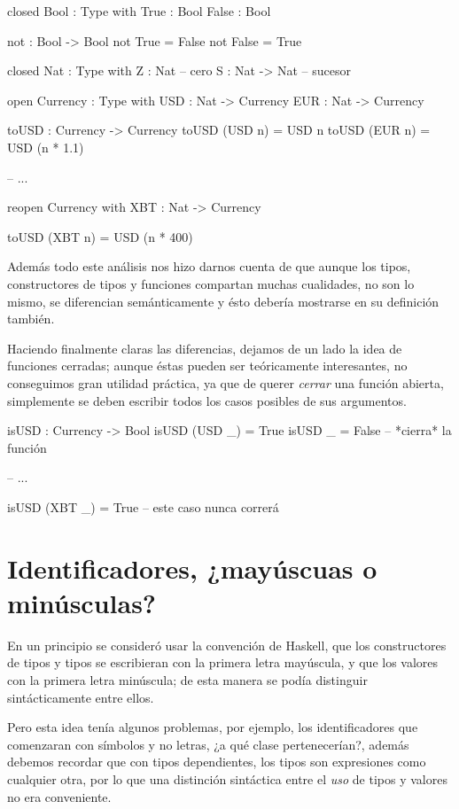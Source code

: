 \begin{blueleft}
\begin{anglercode}
closed Bool : Type with
    True : Bool
    False : Bool

not : Bool -> Bool
not True = False
not False = True

closed Nat : Type with
    Z : Nat             -- cero
    S : Nat -> Nat      -- sucesor

open Currency : Type with
    USD : Nat -> Currency
    EUR : Nat -> Currency

toUSD : Currency -> Currency
toUSD (USD n) = USD n
toUSD (EUR n) = USD (n * 1.1)

-- ...

reopen Currency with
    XBT : Nat -> Currency

toUSD (XBT n) = USD (n * 400)
\end{anglercode}

Además todo este análisis nos hizo darnos cuenta de que aunque los tipos, constructores de tipos y funciones compartan muchas cualidades, no son lo mismo, se diferencian semánticamente y ésto debería mostrarse en su definición también.

Haciendo finalmente claras las diferencias, dejamos de un lado la idea de funciones cerradas; aunque éstas pueden ser teóricamente interesantes, no conseguimos gran utilidad práctica, ya que de querer \textit{cerrar} una función abierta, simplemente se deben escribir todos los casos posibles de sus argumentos.

\begin{anglercode}
isUSD : Currency -> Bool
isUSD (USD _) = True
isUSD _ = False         -- *cierra* la función

-- ...

isUSD (XBT _) = True    -- este caso nunca correrá
\end{anglercode}
\end{blueleft}

\section{Identificadores, ¿mayúscuas o minúsculas?}

\begin{blueleft}
En un principio se consideró usar la convención de Haskell, que los constructores de tipos y tipos se escribieran con la primera letra mayúscula, y que los valores con la primera letra minúscula; de esta manera se podía distinguir sintácticamente entre ellos.

Pero esta idea tenía algunos problemas, por ejemplo, los identificadores que comenzaran con símbolos y no letras, ¿a qué clase pertenecerían?, además debemos recordar que con tipos dependientes, los tipos son expresiones como cualquier otra, por lo que una distinción sintáctica entre el \emph{uso} de tipos y valores no era conveniente.
\end{blueleft}

